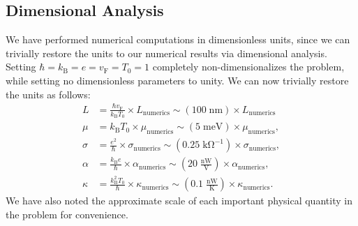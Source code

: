 \documentclass[10pt, oneside]{book}
\begin{document}
\begin{doublespace}
\begin{appendix}
\subsection{Dimensional Analysis}
We have performed numerical computations in dimensionless units,   since we can trivially restore the units to our numerical results via dimensional analysis.   Setting $\hbar=k_{\mathrm{B}}=e=v_{\mathrm{F}}=T_0=1$ completely non-dimensionalizes the problem, while setting no dimensionless parameters to unity.    We can now trivially restore the units as follows:  \begin{subequations}\begin{align}
L &= \frac{\hbar v_{\mathrm{F}}}{k_{\mathrm{B}}T_0} \times L_{\mathrm{numerics}} \sim (100 \; \mathrm{nm}) \times L_{\mathrm{numerics}} \\
\mu &= k_{\mathrm{B}}T_0  \times \mu_{\mathrm{numerics}} \sim (5\; \mathrm{meV}) \times \mu_{\mathrm{numerics}}, \\
\sigma &= \frac{e^2}{\hbar}  \times \sigma_{\mathrm{numerics}} \sim (0.25\; \mathrm{k\Omega}^{-1}) \times \sigma_{\mathrm{numerics}}, \\
\alpha &= \frac{k_{\mathrm{B}}e}{\hbar}  \times \alpha_{\mathrm{numerics}} \sim \left(20\; \frac{\mathrm{nW}}{\mathrm{V}}\right) \times \alpha_{\mathrm{numerics}}, \\
\kappa &= \frac{k_{\mathrm{B}}^2T_0}{\hbar}  \times \kappa_{\mathrm{numerics}} \sim \left(0.1\; \frac{\mathrm{nW}}{\mathrm{K}}\right)  \times \kappa_{\mathrm{numerics}}.
\end{align}\end{subequations}
We have also noted the approximate scale of each important physical quantity in the problem for convenience.


\end{appendix}

\end{doublespace}

\pagestyle{fancy}
\renewcommand{\headrulewidth}{0pt}
\fancyhead{}

\fancyfoot{}
\fancyfoot[C] {\thepage}




\end{document}
